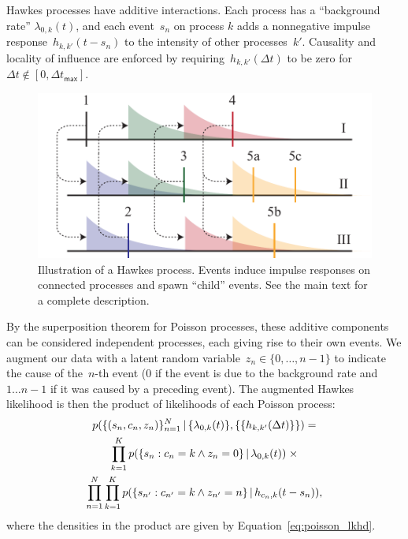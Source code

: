 Hawkes processes have additive interactions. Each process has a ``background rate'' $\lambda_{0,k}(t)$, and each event~$s_n$ on process $k$ adds a nonnegative impulse response~$h_{k,k'}(t-s_n)$ to the intensity of other processes~$k'$. Causality and locality of influence are enforced by requiring~$h_{k,k'}(\Delta t)$ to be zero for~${\Delta t \notin[0,\Delta t_{\mathsf{max}}]}$. 
\begin{figure}[t]
\centering%
\includegraphics[width=\linewidth]{figures/ch2/Hawkes-wide} 
\vspace{-0.25cm}
\caption{Illustration of a Hawkes process. Events induce impulse responses on connected processes and spawn ``child'' events. See the main text for a complete description.}
\label{fig:hawkes}
\vspace{-0.5cm}
\end{figure}

By the superposition theorem for Poisson processes, these additive components can be considered independent processes, each giving rise to their own events. 
We augment our data with a latent random variable~${z_n\in\{0,\ldots,n-1\}}$ to indicate the cause of the~$n$-th event ($0$ if the event is due to the background rate and ${1\ldots n-1}$ if it was caused by a preceding event). The augmented Hawkes likelihood is then the product of likelihoods of each Poisson process:
\begin{multline*}
p(\{(s_n,c_n,z_n)\}^N_{n=1} \,|\, \{\lambda_{0,k}(t)\}, \{\{h_{k,k'}(\Delta t)\}\}) = \\
\prod^K_{k=1} p(\{s_{n}: c_{n}=k \wedge z_{n}=0\}\,|\, \lambda_{0,k}(t))\;\times\\
\prod_{n=1}^N\prod_{k=1}^K p(\{s_{n'}: c_{n'}=k \wedge z_{n'}=n\}\,|\, h_{c_n,k}(t-s_n)),
\end{multline*}
where the densities in the product are given by Equation~\ref{eq:poisson_lkhd}.

